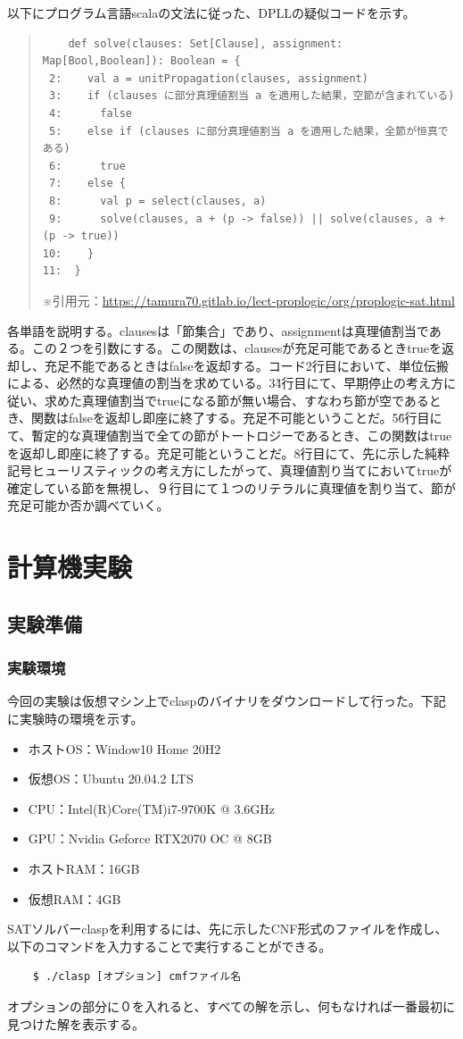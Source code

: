 \documentclass[dvipdfmx]{jsarticle}
\begin{document}
以下にプログラム言語scalaの文法に従った、DPLLの疑似コードを示す。
\begin{quote}
  \begin{verbatim}
    def solve(clauses: Set[Clause], assignment: Map[Bool,Boolean]): Boolean = {
 2:    val a = unitPropagation(clauses, assignment)
 3:    if (clauses に部分真理値割当 a を適用した結果，空節が含まれている)
 4:      false
 5:    else if (clauses に部分真理値割当 a を適用した結果，全節が恒真である)
 6:      true
 7:    else {
 8:      val p = select(clauses, a)
 9:      solve(clauses, a + (p -> false)) || solve(clauses, a + (p -> true))
10:    }
11:  }
  \end{verbatim}
  ※引用元：\url{https://tamura70.gitlab.io/lect-proplogic/org/proplogic-sat.html}
\end{quote}
各単語を説明する。clausesは「節集合」であり、assignmentは真理値割当である。この２つを引数にする。この関数は、clausesが充足可能であるときtrueを返却し、充足不能であるときはfalseを返却する。コード2行目において、単位伝搬による、必然的な真理値の割当を求めている。3\~4行目にて、早期停止の考え方に従い、求めた真理値割当でtrueになる節が無い場合、すなわち節が空であるとき、関数はfalseを返却し即座に終了する。充足不可能ということだ。5\~6行目にて、暫定的な真理値割当で全ての節がトートロジーであるとき、この関数はtrueを返却し即座に終了する。充足可能ということだ。8行目にて、先に示した純粋記号ヒューリスティックの考え方にしたがって、真理値割り当てにおいてtrueが確定している節を無視し、９行目にて１つのリテラルに真理値を割り当て、節が充足可能か否か調べていく。\par
\section{計算機実験}
\subsection{実験準備}
  \subsubsection{実験環境}
  今回の実験は仮想マシン上でclaspのバイナリをダウンロードして行った。下記に実験時の環境を示す。
  \begin{itemize}
    \item ホストOS：Window10 Home 20H2
    \item 仮想OS：Ubuntu 20.04.2 LTS
    \item CPU：Intel(R)Core(TM)i7-9700K @ 3.6GHz
    \item GPU：Nvidia Geforce RTX2070 OC @ 8GB
    \item ホストRAM：16GB
    \item 仮想RAM：4GB
  \end{itemize}
  SATソルバーclaspを利用するには、先に示したCNF形式のファイルを作成し、以下のコマンドを入力することで実行することができる。
  \begin{verbatim}
    $ ./clasp [オプション] cmfファイル名
  \end{verbatim}
  オプションの部分に０を入れると、すべての解を示し、何もなければ一番最初に見つけた解を表示する。
\end{document}
